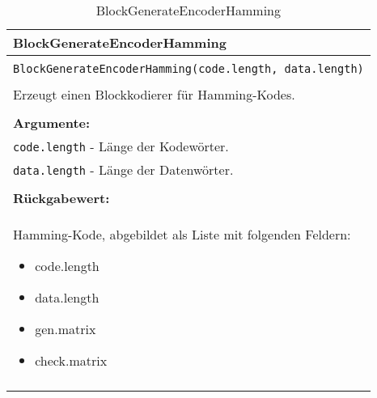 \begin{longtable}{|p{\textwidth}|}
\hline
\rowcolor{lightblue}
BlockGenerateEncoderHamming
\\
\hline
\\
\texttt{BlockGenerateEncoderHamming(code.length, data.length)}\\
\\
Erzeugt einen Blockkodierer für Hamming-Kodes.\\
\\
\textbf{Argumente:}\\
\texttt{code.length} - Länge der Kodewörter.\\
\texttt{data.length} - Länge der Datenwörter.\\
\\
\textbf{Rückgabewert:}\\
Hamming-Kode, abgebildet als Liste mit folgenden Feldern:
\vspace{4mm}
\begin{itemize}
\renewcommand\labelitemi{--}
\itemsep-.5em %
\item code.length
\item data.length
\item gen.matrix
\item check.matrix
\end{itemize}
\\
\hline
\caption{BlockGenerateEncoderHamming}
\end{longtable}